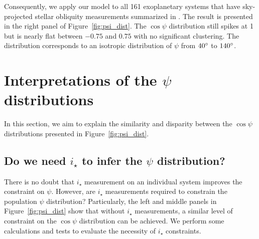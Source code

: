 \documentclass[twocolumn,times]{aastex631}
\newcommand{\numall}{161\xspace}
\begin{document}
Consequently, we apply our model to all \numall exoplanetary systems that have sky-projected stellar obliquity measurements summarized in \cite{Albrecht22}. The result is presented in the right panel of Figure~\ref{fig:psi_dist}. The $\cos{\psi}$ distribution still spikes at 1 but is nearly flat between $-0.75$ and $0.75$ with no significant clustering. The distribution corresponds to an isotropic distribution of $\psi$ from $40\mbox{$^\circ$}$ to $140\mbox{$^\circ$}$.

\section{Interpretations of the \texorpdfstring{$\psi$}{psi} distributions}\label{sec:interpretations}

In this section, we aim to explain the similarity and disparity between the $\cos{\psi}$ distributions presented in Figure~\ref{fig:psi_dist}.

\subsection{Do we need \texorpdfstring{$i_\star$}{istar} to infer the \texorpdfstring{$\psi$}{psi} distribution?}

There is no doubt that $i_\star$ measurement on an individual system improves the constraint on $\psi$. However, are $i_\star$ measurements required to constrain the population $\psi$ distribution? Particularly, the left and middle panels in Figure~\ref{fig:psi_dist} show that without $i_\star$ measurements, a similar level of constraint on the $\cos{\psi}$ distribution can be achieved. We perform some calculations and tests to evaluate the necessity of $i_\star$ constraints.
\end{document}
